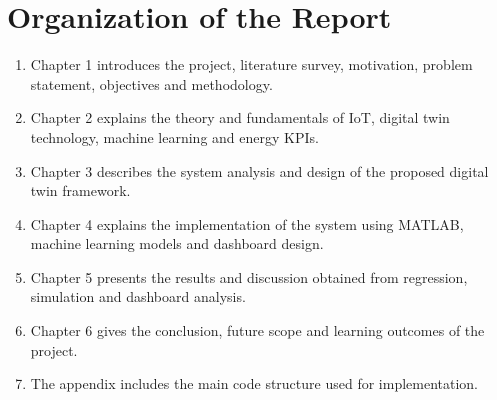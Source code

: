 \section{Organization of the Report}
\begin{enumerate}
    \item Chapter 1 introduces the project, literature survey, motivation, problem statement, objectives and methodology.
    \item Chapter 2 explains the theory and fundamentals of IoT, digital twin technology, machine learning and energy KPIs.
    \item Chapter 3 describes the system analysis and design of the proposed digital twin framework.
    \item Chapter 4 explains the implementation of the system using MATLAB, machine learning models and dashboard design.
    \item Chapter 5 presents the results and discussion obtained from regression, simulation and dashboard analysis.
    \item Chapter 6 gives the conclusion, future scope and learning outcomes of the project.
    \item The appendix includes the main code structure used for implementation.
\end{enumerate}
